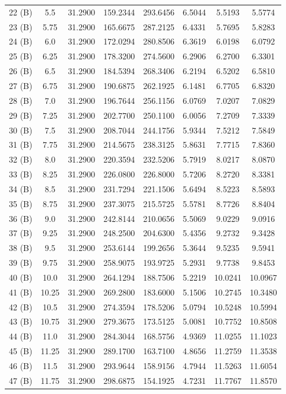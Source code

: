 \begin{landscape}
{\begin{longtable}{c|c|c|c|c|c|c|c}
22 (B)&5.5&31.2900&159.2344&293.6456&6.5044&5.5193&5.5774 \\
23 (B)&5.75&31.2900&165.6675&287.2125&6.4331&5.7695&5.8283 \\
24 (B)&6.0&31.2900&172.0294&280.8506&6.3619&6.0198&6.0792 \\
25 (B)&6.25&31.2900&178.3200&274.5600&6.2906&6.2700&6.3301 \\
26 (B)&6.5&31.2900&184.5394&268.3406&6.2194&6.5202&6.5810 \\
27 (B)&6.75&31.2900&190.6875&262.1925&6.1481&6.7705&6.8320 \\
28 (B)&7.0&31.2900&196.7644&256.1156&6.0769&7.0207&7.0829 \\
29 (B)&7.25&31.2900&202.7700&250.1100&6.0056&7.2709&7.3339 \\
30 (B)&7.5&31.2900&208.7044&244.1756&5.9344&7.5212&7.5849 \\
31 (B)&7.75&31.2900&214.5675&238.3125&5.8631&7.7715&7.8360 \\
32 (B)&8.0&31.2900&220.3594&232.5206&5.7919&8.0217&8.0870 \\
33 (B)&8.25&31.2900&226.0800&226.8000&5.7206&8.2720&8.3381 \\
34 (B)&8.5&31.2900&231.7294&221.1506&5.6494&8.5223&8.5893 \\
35 (B)&8.75&31.2900&237.3075&215.5725&5.5781&8.7726&8.8404 \\
36 (B)&9.0&31.2900&242.8144&210.0656&5.5069&9.0229&9.0916 \\
37 (B)&9.25&31.2900&248.2500&204.6300&5.4356&9.2732&9.3428 \\
38 (B)&9.5&31.2900&253.6144&199.2656&5.3644&9.5235&9.5941 \\
39 (B)&9.75&31.2900&258.9075&193.9725&5.2931&9.7738&9.8453 \\
40 (B)&10.0&31.2900&264.1294&188.7506&5.2219&10.0241&10.0967 \\
41 (B)&10.25&31.2900&269.2800&183.6000&5.1506&10.2745&10.3480 \\
42 (B)&10.5&31.2900&274.3594&178.5206&5.0794&10.5248&10.5994 \\
43 (B)&10.75&31.2900&279.3675&173.5125&5.0081&10.7752&10.8508 \\
44 (B)&11.0&31.2900&284.3044&168.5756&4.9369&11.0255&11.1023 \\
45 (B)&11.25&31.2900&289.1700&163.7100&4.8656&11.2759&11.3538 \\
46 (B)&11.5&31.2900&293.9644&158.9156&4.7944&11.5263&11.6054 \\
47 (B)&11.75&31.2900&298.6875&154.1925&4.7231&11.7767&11.8570 \\

\end{longtable}}
\end{landscape}
